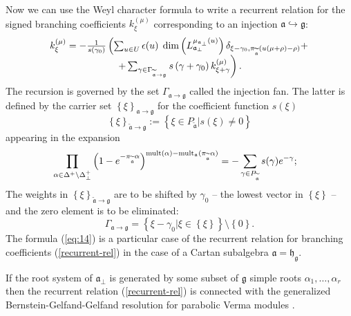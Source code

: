 \documentclass[preprint,12pt]{elsarticle}
\newcommand{\gf}{\mathfrak{g}}
\newcommand{\af}{\mathfrak{a}}
\newcommand{\afb}{\mathfrak{a}_{\bot}}
\newcommand{\hf}{\mathfrak{h}}
\newcommand{\hfg}{\hf_{\gf}}
\begin{document}
Now we can use the Weyl character formula to write a
recurrent relation \cite{2010arXiv1007.0318L} for the signed branching
coefficients $k_{\xi }^{\left( \mu \right) }$ corresponding to an
injection $\af\hookrightarrow \gf$:
\begin{equation}
\begin{array}{c}
k_{\xi }^{\left( \mu \right) }=-\frac{1}{s\left( \gamma _{0}\right) }\left(
\sum_{u\in U}\epsilon (u)\;\dim \left( L_{\afb}^{\mu _{\af%
_{\perp }}\left( u\right) }\right) \delta _{\xi -\gamma _{0},\pi _{%
\widetilde{\af}}(u(\mu +\rho )-\rho )}+\right.  \\
\left. +\sum_{\gamma \in \Gamma _{\widetilde{\af}\rightarrow \gf%
}}s\left( \gamma +\gamma _{0}\right) k_{\xi +\gamma }^{\left( \mu \right)
}\right) .
\end{array}
\label{recurrent-rel}
\end{equation}
The recursion is governed by the set $\Gamma _{\af\rightarrow \gf}$ called the injection fan. The latter is defined by the
carrier set $\left\{ \xi \right\} _{\af\rightarrow \gf}$ for the
coefficient function $s(\xi )$
\begin{equation*}
\left\{ \xi \right\} _{\widetilde{\af}\rightarrow \gf}:=\left\{
\xi \in P_{\widetilde{\af}}|s(\xi )\neq 0\right\}
\end{equation*}
appearing in the expansion
\begin{equation}
\prod_{\alpha \in \Delta ^{+}\setminus \Delta _{\bot }^{+}}\left( 1-e^{-\pi
_{\widetilde{\af}}\alpha }\right) ^{\mathrm{mult}(\alpha )-\mathrm{mult}%
_{\af}(\pi _{\widetilde{\af}}\alpha )}=-\sum_{\gamma \in P_{%
\widetilde{\af}}}s(\gamma )e^{-\gamma };\quad
\end{equation}
The weights in $\left\{ \xi \right\} _{\widetilde{\af}\rightarrow \gf}$ are to be shifted by $\gamma _{0}$ -- the lowest vector in $\left\{ \xi
\right\} $ -- and the zero element is to be eliminated:
\begin{equation}
\Gamma _{\af\rightarrow \gf}=\left\{ \xi -\gamma
_{0}|\xi \in \left\{ \xi \right\} \right\} \setminus \left\{ 0\right\} .
\end{equation}
The formula (\ref{eq:14}) is a particular case of the recurrent relation for branching coefficients (\ref{recurrent-rel}) in the case of a Cartan subalgebra $\af=\hfg$.

If the root system of $\afb$ is generated by some subset of $\gf$
simple roots $\alpha_{1},\dots,\alpha_{r}$ then the recurrent
relation (\ref{recurrent-rel}) is connected with the generalized
Bernstein-Gelfand-Gelfand resolution for parabolic Verma modules
\cite{2011arXiv1102.1702L}.
\end{document}
